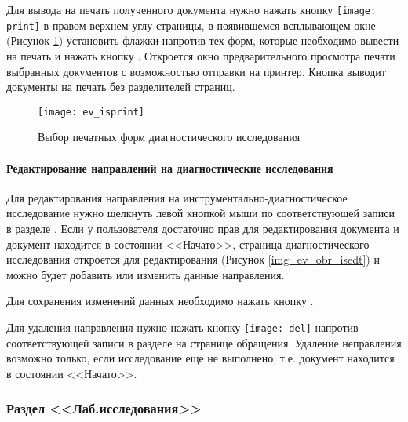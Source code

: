 {{%

Для вывода на печать полученного документа нужно нажать кнопку \texttt{[image: print]} в правом верхнем углу страницы, в появившемся всплывающем окне (Рисунок \ref{img_ev_isprint}) установить флажки напротив тех форм, которые необходимо вывести на печать и нажать кнопку . Откроется окно предварительного просмотра печати выбранных документов с возможностью отправки на принтер. Кнопка  выводит документы на печать без разделителей страниц.

 \begin{figure}[ht]\centering
   \texttt{[image: ev\_isprint]}
   \caption{Выбор печатных форм диагностического исследования}
   \label{img_ev_isprint}
 \end{figure}
}{}
 
\paragraph{Редактирование направлений на диагностические исследования} \label{ev_obr_isedt}

Для редактирования направления на инструментально-диагностическое исследование нужно щелкнуть левой кнопкой мыши по соответствующей записи в разделе . Если у пользователя достаточно прав для редактирования документа и документ находится в состоянии <<Начато>>, страница диагностического исследования откроется для редактирования (Рисунок \ref{img_ev_obr_isedt}) и можно будет добавить или изменить данные направления.

Для сохранения изменений данных необходимо нажать кнопку .

Для удаления направления нужно нажать кнопку \texttt{[image: del]} напротив соответствующей записи в разделе  на странице обращения. Удаление неправления возможно только, если исследование еще не выполнено, т.е. документ находится в состоянии <<Начато>>.

\subsubsection{Раздел <<Лаб.исследования>>}

}
